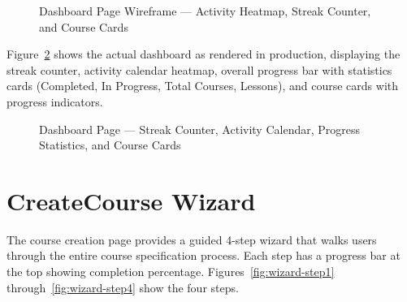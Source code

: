 \documentclass[12pt,a4paper]{report}
\begin{document}
\begin{figure}[H]
    \caption{Dashboard Page Wireframe --- Activity Heatmap, Streak Counter, and Course Cards}
    \label{fig:dashboard}
\end{figure}

Figure~\ref{fig:dashboard-screenshot} shows the actual dashboard as rendered in production, displaying the streak counter, activity calendar heatmap, overall progress bar with statistics cards (Completed, In Progress, Total Courses, Lessons), and course cards with progress indicators.

\begin{figure}[H]
    \centering
    \caption{Dashboard Page --- Streak Counter, Activity Calendar, Progress Statistics, and Course Cards}
    \label{fig:dashboard-screenshot}
\end{figure}

\section{CreateCourse Wizard}
The course creation page provides a guided 4-step wizard that walks users through the entire course specification process. Each step has a progress bar at the top showing completion percentage. Figures~\ref{fig:wizard-step1} through~\ref{fig:wizard-step4} show the four steps.
\end{document}
